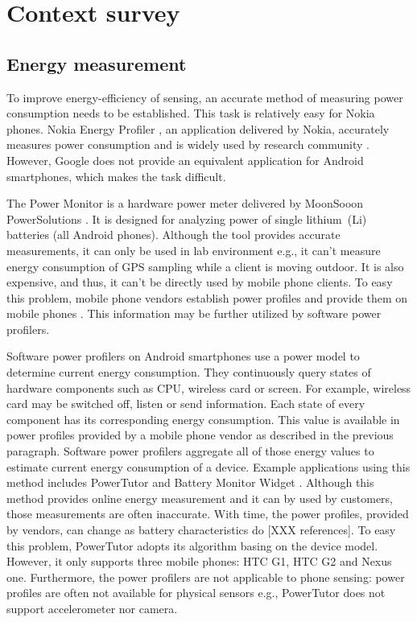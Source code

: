 \section{Context survey}
\label{s:contextsurvey}
\subsection{Energy measurement}
\hspace{10pt} To improve energy-efficiency of sensing, an accurate method of measuring power consumption needs to be established. This task is relatively easy for Nokia phones. Nokia Energy Profiler \cite{nokia:profiler}, an application delivered by Nokia,  accurately measures power consumption and is widely used by research community \cite{kjaergaard:entracked} \cite{lu:jigsaw} \cite{li:status}. However, Google does not provide an equivalent application for Android smartphones, which makes the task difficult.

The Power Monitor is a hardware power meter delivered by MoonSooon PowerSolutions \cite{monsoon:powermonitor}.  It is designed for analyzing power of single lithium\ (Li) batteries (all Android phones). Although the tool provides accurate measurements, it can only be used in lab environment e.g., it can't measure energy consumption of GPS sampling while a client is moving outdoor. It is also expensive, and thus, it can't be directly used by mobile phone clients. To easy this problem, mobile phone vendors establish power profiles and provide them on mobile phones \cite{android:powerprofiles}. This information may be further utilized by software power profilers.

Software power profilers on Android smartphones use a power model to determine current energy consumption. They continuously query states of hardware components such as CPU, wireless card or screen. For example, wireless card may be switched off, listen or send information. Each state of every component has its corresponding energy consumption. This value is available in power profiles provided by a mobile phone vendor as described in the previous paragraph. Software power profilers aggregate all of those energy values to estimate current energy consumption of a device. Example applications using this method includes PowerTutor \cite{zhang:powertutor} and Battery Monitor Widget \cite{googleplay:batterymonitorwidget}. Although this method provides online energy measurement and it can by used by customers, those measurements are often inaccurate. With time, the power profiles, provided by vendors, can change as battery characteristics do [XXX references]. To easy this problem, PowerTutor adopts its algorithm basing on the device model. However, it only supports three mobile phones: HTC G1, HTC G2 and Nexus one. Furthermore, the power profilers are not applicable to phone sensing: power profiles are often not available for physical sensors e.g., PowerTutor does not support accelerometer nor camera.

